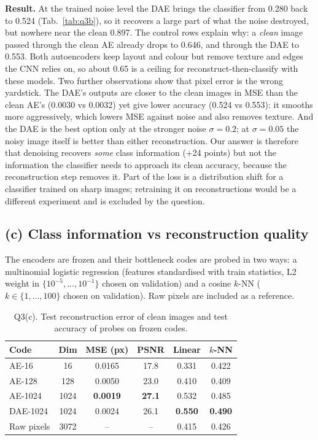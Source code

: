 \textbf{Result.} At the trained noise level the DAE brings the classifier from 0.280 back to 0.524
(Tab.~\ref{tab:q3b}), so it recovers a large part of what the noise destroyed, but nowhere near the clean
0.897. The control rows explain why: a \emph{clean} image passed through the clean AE already drops to 0.646, and
through the DAE to 0.553. Both autoencoders keep layout and colour but remove texture and edges the CNN relies
on, so about 0.65 is a ceiling for reconstruct-then-classify with these models. Two further observations show
that pixel error is the wrong yardstick. The DAE's outputs are closer to the clean images in MSE than the clean
AE's (0.0030 vs 0.0032) yet give lower accuracy (0.524 vs 0.553): it smooths more aggressively, which lowers MSE
against noise and also removes texture. And the DAE is the best option only at the stronger noise $\sigma=0.2$;
at $\sigma=0.05$ the noisy image itself is better than either reconstruction. Our answer is therefore that
denoising recovers \emph{some} class information (+24 points) but not the information the classifier needs to
approach its clean accuracy, because the reconstruction step removes it. Part of the loss is a distribution
shift for a classifier trained on sharp images; retraining it on reconstructions would be a different experiment
and is excluded by the question.

\subsection{(c) Class information vs reconstruction quality}
The encoders are frozen and their bottleneck codes are probed in two ways: a multinomial logistic regression
(features standardised with train statistics, L2 weight in $\{10^{-5},\dots,10^{-1}\}$ chosen on validation) and
a cosine $k$-NN ($k\in\{1,\dots,100\}$ chosen on validation). Raw pixels are included as a reference.

\begin{table}[t]
\centering
\small
\begin{tabular}{@{}lccccc@{}}
\toprule
Code & Dim & MSE (px) & PSNR & Linear & $k$-NN \\
\midrule
AE-16 & 16 & 0.0165 & 17.8 & 0.331 & 0.422 \\
AE-128 & 128 & 0.0050 & 23.0 & 0.410 & 0.409 \\
AE-1024 & 1024 & \textbf{0.0019} & \textbf{27.1} & 0.532 & 0.485 \\
DAE-1024 & 1024 & 0.0024 & 26.1 & \textbf{0.550} & \textbf{0.490} \\
Raw pixels & 3072 & -- & -- & 0.415 & 0.426 \\
\bottomrule
\end{tabular}
\caption{Q3(c). Test reconstruction error of clean images and test accuracy of probes on frozen codes.}
\label{tab:q3c}
\end{table}

